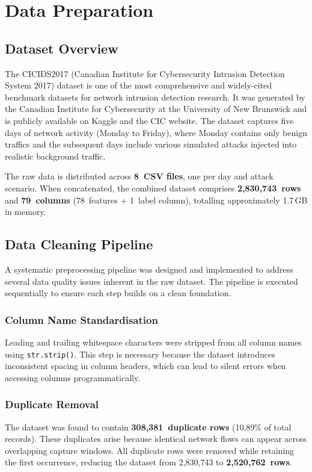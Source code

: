 \documentclass[12pt, a4paper]{article}
\begin{document}
\newpage
\section{Data Preparation}

\subsection{Dataset Overview}

The CICIDS2017 (Canadian Institute for Cybersecurity Intrusion Detection System 2017) dataset is one of the most comprehensive and widely-cited benchmark datasets for network intrusion detection research.
It was generated by the Canadian Institute for Cybersecurity at the University of New Brunswick and is publicly available on Kaggle and the CIC website.
The dataset captures five days of network activity (Monday to Friday), where Monday contains only benign traffics and the subsequent days include various simulated attacks injected into realistic background traffic.

The raw data is distributed across \textbf{8~CSV files}, one per day and attack scenario.
When concatenated, the combined dataset comprises \textbf{2,830,743~rows} and \textbf{79~columns} (78~features + 1~label column), totalling approximately 1.7\,GB in memory.

\subsection{Data Cleaning Pipeline}

A systematic preprocessing pipeline was designed and implemented to address several data quality issues inherent in the raw dataset.
The pipeline is executed sequentially to ensure each step builds on a clean foundation.

\subsubsection{Column Name Standardisation}
Leading and trailing whitespace characters were stripped from all column names using \texttt{str.strip()}.
This step is necessary because the dataset introduces inconsistent spacing in column headers, which can lead to silent errors when accessing columns programmatically.

\subsubsection{Duplicate Removal}
The dataset was found to contain \textbf{308,381~duplicate rows} (10.89\% of total records).
These duplicates arise because identical network flows can appear across overlapping capture windows.
All duplicate rows were removed while retaining the first occurrence, reducing the dataset from 2,830,743 to \textbf{2,520,762~rows}.
\end{document}
